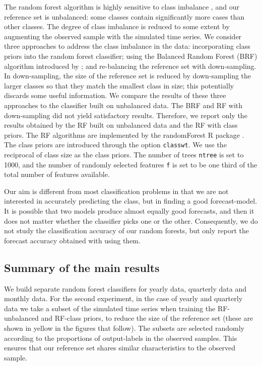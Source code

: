 \documentclass[11pt,a4paper,]{article}
\theoremstyle{definition}
\theoremstyle{definition}
\theoremstyle{definition}
\theoremstyle{remark}
\begin{document}
The random forest algorithm is highly sensitive to class imbalance
\autocite{breiman2001random}, and our reference set is unbalanced: some
classes contain significantly more cases than other classes. The degree
of class imbalance is reduced to some extent by augmenting the observed
sample with the simulated time series. We consider three approaches to
address the class imbalance in the data: incorporating class priors into
the random forest classifier; using the Balanced Random Forest (BRF)
algorithm introduced by \textcite{chen2004using}; and re-balancing the
reference set with down-sampling. In down-sampling, the size of the
reference set is reduced by down-sampling the larger classes so that
they match the smallest class in size; this potentially discards some
useful information. We compare the results of these three approaches to
the classifier built on unbalanced data. The BRF and RF with
down-sampling did not yield satisfactory results. Therefore, we report
only the results obtained by the RF built on unbalanced data and the RF
with class priors. The RF algorithms are implemented by the randomForest
R package \autocites{liaw2002randomforest}{rfpkg}. The class priors are
introduced through the option \texttt{classwt}. We use the reciprocal of
class size as the class priors. The number of trees \texttt{ntree} is
set to 1000, and the number of randomly selected features \texttt{f} is
set to be one third of the total number of features available.

Our aim is different from most classification problems in that we are
not interested in accurately predicting the class, but in finding a good
forecast-model. It is possible that two models produce almost equally
good forecasts, and then it does not matter whether the classifier picks
one or the other. Consequently, we do not study the classification
accuracy of our random forests, but only report the forecast accuracy
obtained with using them.

\subsection{Summary of the main results}\label{sec:results}

We build separate random forest classifiers for yearly data, quarterly
data and monthly data. For the second experiment, in the case of yearly
and quarterly data we take a subset of the simulated time series when
training the RF-unbalanced and RF-class priors, to reduce the size of
the reference set (these are shown in yellow in the figures that
follow). The subsets are selected randomly according to the proportions
of output-labels in the observed samples. This ensures that our
reference set shares similar characteristics to the observed sample.
\end{document}
